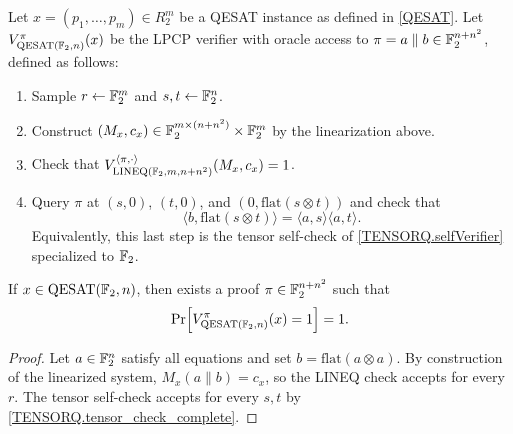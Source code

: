 \begin{definition}
\label{QESAT.verifier}
\leanok
Let \(x=(p_1,\dots,p_m) \in R_{2}^{m}\) be a QESAT instance as defined in \ref{QESAT}. Let \(V_{\mathrm{QESAT}(\mathbb{F}_2,n)}^{\pi}(x)\) be the LPCP verifier 
with oracle access to \(\pi=a\parallel b\in\mathbb{F}_2^{n+n^2}\), defined as follows:
\begin{enumerate}
  \item Sample $r \gets \mathbb{F}_{2}^m$ and $s, t \gets \mathbb{F}_{2}^n$.
  \item Construct \((M_{x},c_{x}) \in \mathbb{F}_2^{m \times (n+n^2)} \times \mathbb{F}_2^m\) by the linearization above.
  \item Check that \(V_{\mathrm{LINEQ}(\mathbb{F}_2,m,n+n^2)}^{\langle \pi, \cdot \rangle } (M_{x},c_{x}) = 1\).
  \item Query \(\pi\) at
  \((s,0)\), \((t,0)\), and \((0,\mathrm{flat}(s\otimes t))\) and check that
  \[
    \langle b,\mathrm{flat}(s\otimes t)\rangle
    =\langle a,s\rangle\langle a,t\rangle .
  \]
  Equivalently, this last step is the tensor self-check of \ref{TENSORQ.selfVerifier} specialized to \(\mathbb{F}_2\).
\end{enumerate}
\end{definition}

\begin{lemma}[Completeness]
\label{QESAT.verifier_completeness}
\leanok
If \(x\in \mathrm{QESAT}(\mathbb{F}_2,n)\), then exists a proof
\(\pi\in\mathbb{F}_2^{n+n^2}\) such that \[\Pr\!\left[V_{\mathrm{QESAT}(\mathbb{F}_2,n)}^{\pi}(x)=1\right]=1.\]
\end{lemma}
\begin{proof}\leanok
Let \(a\in\mathbb{F}_2^n\) satisfy all equations and set
\(b=\mathrm{flat}(a\otimes a)\). By construction of the linearized system,
\(M_x(a\parallel b)=c_x\), so the LINEQ check
accepts for every \(r\). The tensor self-check accepts for every \(s,t\) by
\ref{TENSORQ.tensor_check_complete}.
\end{proof}

